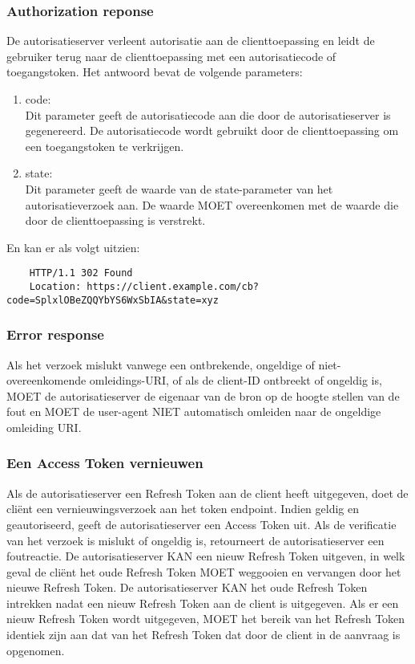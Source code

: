 \subsubsection{Authorization reponse}%
\label{subsubsec:authorization-reponse}
De autorisatieserver verleent autorisatie aan de clienttoepassing en leidt de gebruiker terug naar de clienttoepassing met een autorisatiecode of toegangstoken. Het antwoord bevat de volgende parameters:
\begin{enumerate}[label=\textbf{-}]
    \item code: \\
    Dit parameter geeft de autorisatiecode aan die door de autorisatieserver is gegenereerd. De autorisatiecode wordt gebruikt door de clienttoepassing om een toegangstoken te verkrijgen.
  
    \item state: \\
    Dit parameter geeft de waarde van de state-parameter van het autorisatieverzoek aan. De waarde MOET overeenkomen met de waarde die door de clienttoepassing is verstrekt.
  \end{enumerate}
  En kan er als volgt uitzien:
  \begin{verbatim}
    HTTP/1.1 302 Found
    Location: https://client.example.com/cb?code=SplxlOBeZQQYbYS6WxSbIA&state=xyz
  \end{verbatim}

\subsubsection{Error response}%
\label{subsubsec:error-response}
Als het verzoek mislukt vanwege een ontbrekende, ongeldige of niet-overeenkomende omleidings-URI, of als de client-ID ontbreekt of ongeldig is, MOET de autorisatieserver de eigenaar van de bron op de hoogte stellen van de fout en MOET de user-agent NIET automatisch omleiden naar de ongeldige omleiding URI.

\subsubsection{Een Access Token vernieuwen}%
\label{subsubsec:een-access-token-vernieuwen}
Als de autorisatieserver een Refresh Token aan de client heeft uitgegeven, doet de cliënt een vernieuwingsverzoek aan het token endpoint.
Indien geldig en geautoriseerd, geeft de autorisatieserver een Access Token uit. Als de verificatie van het verzoek is mislukt of ongeldig is, retourneert de autorisatieserver een foutreactie.
De autorisatieserver KAN een nieuw Refresh Token uitgeven, in welk geval de cliënt het oude Refresh Token MOET weggooien en vervangen door het nieuwe Refresh Token. De autorisatieserver KAN het oude Refresh Token intrekken nadat een nieuw Refresh Token aan de client is uitgegeven. Als er een nieuw Refresh Token wordt uitgegeven, MOET het bereik van het Refresh Token identiek zijn aan dat van het Refresh Token dat door de client in de aanvraag is opgenomen.

